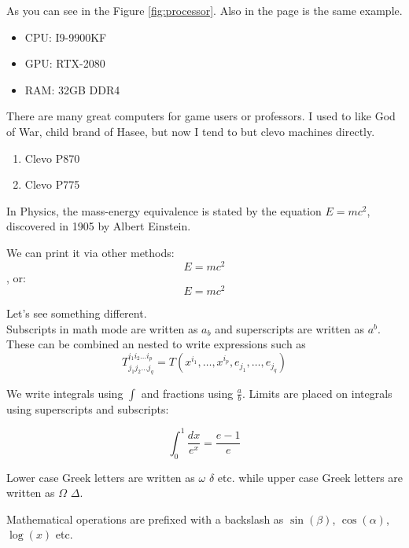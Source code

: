 \documentclass[12pt, letterpaper, twoside]{article}
\begin{document}
As you can see in the Figure \ref{fig:processor}. Also in the page \pageref{fig:processor} is the same example.


\begin{itemize}
	\item CPU: I9-9900KF
	\item GPU: RTX-2080
	\item RAM: 32GB DDR4
\end{itemize}


There are many great computers for game users or professors. I used to like God of War, child brand of Hasee, but now I tend to but clevo machines directly.
\begin{enumerate}
	\item Clevo P870
	\item Clevo P775
\end{enumerate}

In Physics, the mass-energy equivalence is stated by the equation $E=mc^2$, discovered in 1905 by Albert Einstein.

We can print it via other methods:
\[ E=mc^2 \], or:
\begin{equation}
E=mc^2
\end{equation}


Let's see something different.\\
Subscripts in math mode are written as $a_b$ and superscripts are written as $a^b$. These can be combined an nested to write expressions such as 
\begin{equation}
T^{i_1 i_2 \dots i_p}_{j_1 j_2 \dots j_q} = T(x^{i_1}, \dots, x^{i_p}, e_{j_1}, \dots, e_{j_q})
\end{equation}

We write integrals using $\int$ and fractions using $\frac{a}{b}$. Limits are placed on integrals using superscripts and  subscripts:

\begin{equation}
\int_0^1 \frac{dx}{e^x}=\frac{e-1}{e}
\end{equation}

Lower case Greek letters are written as $\omega$ $\delta$ etc. while upper case Greek letters are written as $\Omega$ $\Delta$.

Mathematical operations are prefixed with a backslash as $\sin(\beta)$, $\cos(\alpha)$, $\log(x)$ etc.
\end{document}
